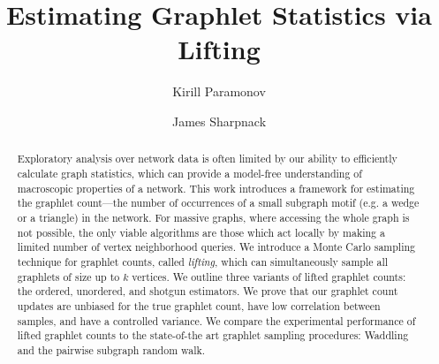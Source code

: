 \documentclass[sigconf]{acmart}
\begin{document}
\title{Estimating Graphlet Statistics via Lifting}

\author{Kirill Paramonov}


\author{James Sharpnack}

\begin{abstract}
    Exploratory analysis over network data is often limited by our ability to efficiently calculate graph statistics, which can provide a model-free understanding of macroscopic properties of a network.
    This work introduces a framework for estimating the graphlet count---the number of occurrences of a small subgraph motif (e.g. a wedge or a triangle) in the network.
	For massive graphs, where accessing the whole graph is not possible, the only viable algorithms are those which act locally by making a limited number of vertex neighborhood queries.
    We introduce a Monte Carlo sampling technique for graphlet counts, called {\em lifting}, which can simultaneously sample all graphlets of size up to $k$ vertices.
    We outline three variants of lifted graphlet counts: the ordered, unordered, and shotgun estimators. 
	We prove that our graphlet count updates are unbiased for the true graphlet count, have low correlation between samples, and have a controlled variance.
	We compare the experimental performance of lifted graphlet counts to the state-of-the art graphlet sampling procedures: Waddling and the pairwise subgraph random walk.
	
	
	
\end{abstract}
\end{document}

